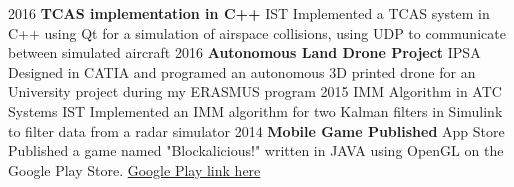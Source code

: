 \documentclass[]{friggeri-cv} %
\begin{document}
\begin{entrylist}

\entry
{2016}
{\textbf{TCAS implementation in C++}}
{IST}
{Implemented a TCAS system in C++ using Qt for a simulation of airspace collisions, using UDP to communicate between simulated aircraft}
\entry
{2016}
{\textbf{Autonomous Land Drone Project}}
{IPSA}
{Designed in CATIA and programed an autonomous 3D printed drone for an University project during my ERASMUS program}
\entry
{2015}
{IMM Algorithm in ATC Systems}
{IST}
{Implemented an IMM algorithm for two Kalman filters in Simulink to filter data from a radar simulator}
\entry
{2014}
{\textbf{Mobile Game Published}}
{App Store}
{Published a game named "Blockalicious!" written in JAVA using OpenGL on the Google Play Store. 
\href{https://play.google.com/store/apps/details?id=com.guiero.blockaliciousfinal}{Google Play link here}}




\end{entrylist}





\end{document}
